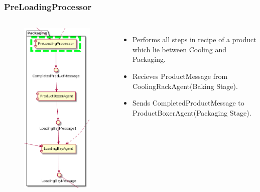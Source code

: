 \documentclass{beamer}
\begin{document}
\begin{frame}
    \frametitle{\huge{PreLoadingProcessor}}
    \begin{columns}[t]
        \begin{figure}[H]
            \centering
            \includegraphics[width=0.55\linewidth]{pre_loading.png}
        \end{figure}
            \begin{itemize}
                \item Performs all steps in recipe of a product which lie between Cooling and Packaging.
                \item Recieves ProductMessage from CoolingRackAgent(Baking Stage).
                \item Sends CompletedProductMessage to ProductBoxerAgent(Packaging Stage).
            \end{itemize}
    \end{columns}
\end{frame}
\end{document}
